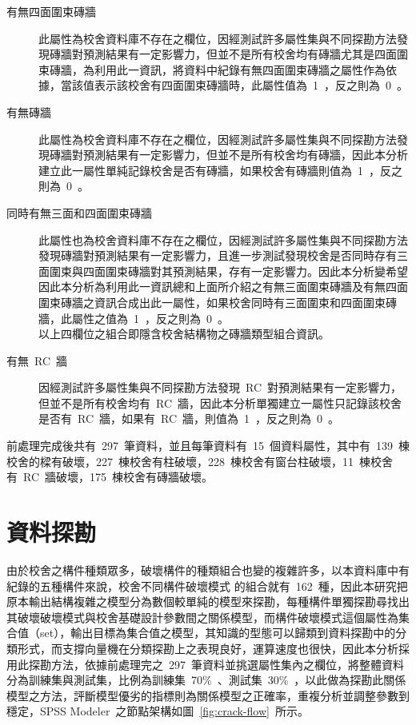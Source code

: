 \begin{description}
  \item[有無四面圍束磚牆]
  此屬性為校舍資料庫不存在之欄位，因經測試許多屬性集與不同探勘方法發現磚牆對預測結果有一定影響力，但並不是所有校舍均有磚牆尤其是四面圍束磚牆，為利用此一資訊，將資料中紀錄有無四面圍束磚牆之屬性作為依據，當該值表示該校舍有四面圍束磚牆時，此屬性值為~1~，反之則為~0~。
  \item[有無磚牆]
  此屬性為校舍資料庫不存在之欄位，因經測試許多屬性集與不同探勘方法發現磚牆對預測結果有一定影響力，但並不是所有校舍均有磚牆，因此本分析建立此一屬性單純記錄校舍是否有磚牆，如果校舍有磚牆則值為~1~，反之則為~0~。
  \item[同時有無三面和四面圍束磚牆]
  此屬性也為校舍資料庫不存在之欄位，因經測試許多屬性集與不同探勘方法發現磚牆對預測結果有一定影響力，且進一步測試發現校舍是否同時存有三面圍束與四面圍束磚牆對其預測結果，存有一定影響力。因此本分析變希望因此本分析為利用此一資訊總和上面所介紹之有無三面圍束磚牆及有無四面圍束磚牆之資訊合成出此一屬性，如果校舍同時有三面圍束和四面圍束磚牆，此屬性之值為~1~，反之則為~0~。\\
  以上四欄位之組合即隱含校舍結構物之磚牆類型組合資訊。
  \item[有無~RC~牆]
  因經測試許多屬性集與不同探勘方法發現~RC~對預測結果有一定影響力，但並不是所有校舍均有~RC~牆，因此本分析單獨建立一屬性只記錄該校舍是否有~RC~牆，如果有~RC~牆，則值為~1~，反之則為~0~。
\end{description}

前處理完成後共有~297~筆資料，並且每筆資料有~15~個資料屬性，其中有~139~棟校舍的樑有破壞，227~棟校舍有柱破壞，228~棟校舍有窗台柱破壞，11~棟校舍有~RC~牆破壞，175~棟校舍有磚牆破壞。

\section{資料探勘}

由於校舍之構件種類眾多，破壞構件的種類組合也變的複雜許多，以本資料庫中有紀錄的五種構件來說，校舍不同構件破壞模式  的組合就有~162~種，因此本研究把原本輸出結構複雜之模型分為數個較單純的模型來探勘，每種構件單獨探勘尋找出其破壞破壞模式與校舍基礎設計參數間之關係模型，而構件破壞模式這個屬性為集合值（set），輸出目標為集合值之模型，其知識的型態可以歸類到資料探勘中的分類形式，而支撐向量機在分類探勘上之表現良好，運算速度也很快，因此本分析採用此探勘方法，依據前處理完之~297~筆資料並挑選屬性集內之欄位，將整體資料分為訓練集與測試集，比例為訓練集~70\%~、測試集~30\%~，以此做為探勘此關係模型之方法，評斷模型優劣的指標則為關係模型之正確率，重複分析並調整參數到穩定，SPSS Modeler~之節點架構如圖~\ref{fig:crack-flow}~所示。

